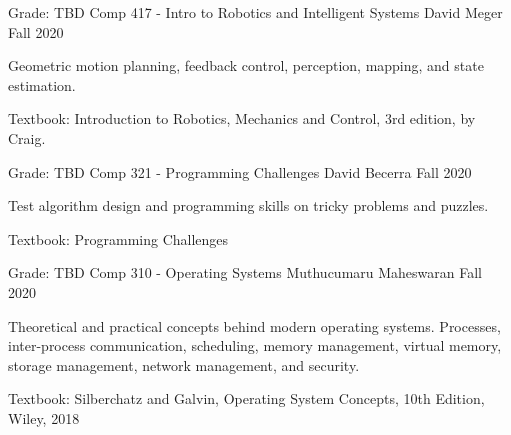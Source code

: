 

\begin{cventries}

  \cventry
  {Grade: TBD} %
    {Comp 417 - Intro to Robotics and Intelligent Systems} %
    {David Meger} %
    {Fall 2020} %
    {
      \begin{cvitems} %
      \item {Geometric motion planning, feedback control, perception, mapping, and state estimation.} 
      \item {Textbook: Introduction to Robotics, Mechanics and Control, 3rd edition, by Craig.}
      \end{cvitems}
    }

  \cventry
    {Grade: TBD} %
    {Comp 321 - Programming Challenges} %
    {David Becerra} %
    {Fall 2020} %
    {
      \begin{cvitems} %
      \item {Test algorithm design and programming skills on tricky problems and puzzles.}
      \item {Textbook: Programming Challenges}
      \end{cvitems}
    }

  \cventry
    {Grade: TBD} %
    {Comp 310 - Operating Systems} %
    {Muthucumaru Maheswaran} %
    {Fall 2020} %
    {
      \begin{cvitems} %
      \item {Theoretical and practical concepts behind modern operating systems. Processes, inter-process communication, scheduling, memory management, virtual memory, storage management, network management, and security.}
      \item {Textbook: Silberchatz and Galvin, Operating System Concepts, 10th Edition, Wiley, 2018}
      \end{cvitems}
    }


\end{cventries}
